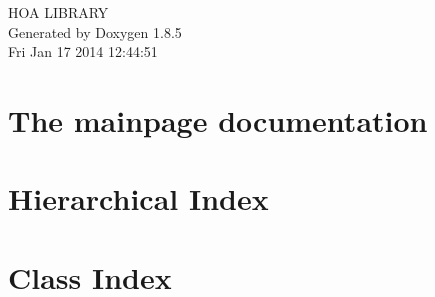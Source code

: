 \documentclass[twoside]{book}
\newcommand{\clearemptydoublepage}{%
  \newpage{\pagestyle{empty}\cleardoublepage}%
}
\begin{document}
\hypersetup{pageanchor=false}
\begin{titlepage}
\vspace*{7cm}
\begin{center}%
{\Large H\-O\-A L\-I\-B\-R\-A\-R\-Y }\\
\vspace*{1cm}
{\large Generated by Doxygen 1.8.5}\\
\vspace*{0.5cm}
{\small Fri Jan 17 2014 12:44:51}\\
\end{center}
\end{titlepage}
\clearemptydoublepage
\tableofcontents
\clearemptydoublepage
{}
\hypersetup{pageanchor=true}

\chapter{The mainpage documentation}
\label{index}\hypertarget{index}{}
\chapter{Hierarchical Index}

\chapter{Class Index}

\end{document}
